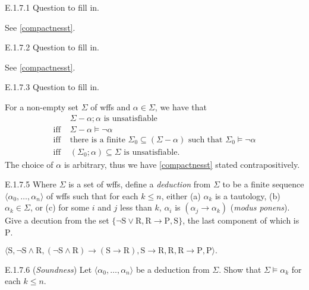 \begin{exercise}{E.1.7.1}
  Question to fill in.
\end{exercise}

See \ref{compactnesst}.

\begin{exercise}{E.1.7.2}
  Question to fill in.
\end{exercise}

See \ref{compactnesst}.

\begin{exercise}{E.1.7.3}
  Question to fill in.
\end{exercise}

For a non-empty set $\Sigma$ of wffs and $\alpha\in \Sigma$, we have that
\begin{align*}
              & \Sigma-\alpha;\alpha\text{ is unsatisfiable}                                                        \\
  \text{iff } & \Sigma-\alpha\vDash\neg\alpha                                                                       \\
  \text{iff } & \text{there is a finite }\Sigma_0\subseteq(\Sigma-\alpha)\text{ such that }\Sigma_0\vDash\neg\alpha \\
  \text{iff } & (\Sigma_0;\alpha)\subseteq \Sigma\text{ is unsatisfiable}.
\end{align*}
The choice of $\alpha$ is arbitrary, thus we have \ref{compactnesst} stated contrapositively.

\setcounter{exercise}{4}

\begin{exercise}{E.1.7.5}
  Where $\Sigma$ is a set of wffs, define a \textit{deduction} from $\Sigma$ to be a finite sequence $\langle \alpha_0,\dots,\alpha_n\rangle$ of wffs such that for each $k\leq n$, either (a) $\alpha_k$ is a tautology, (b) $\alpha_k\in \Sigma$, or (c) for some $i$ and $j$ less than $k$, $\alpha_i$ is $(\alpha_j\rightarrow \alpha_k)$ (\textit{modus ponens}). Give a decution from the set $\{\mathrm{\neg S\vee R, R\rightarrow P, S}\}$, the last component of which is $\mathrm{P}$.
\end{exercise}

$\mathrm{\langle S,\neg S\wedge R, (\neg S\wedge R)\rightarrow(S\rightarrow R), S\rightarrow R, R, R\rightarrow P, P\rangle.}$

\begin{exercise}{E.1.7.6}
  (\textit{Soundness}) Let $\langle \alpha_0,\dots,\alpha_n\rangle$ be a deduction from $\Sigma$. Show that $\Sigma\vDash \alpha_k$ for each $k\leq n$.
\end{exercise}

